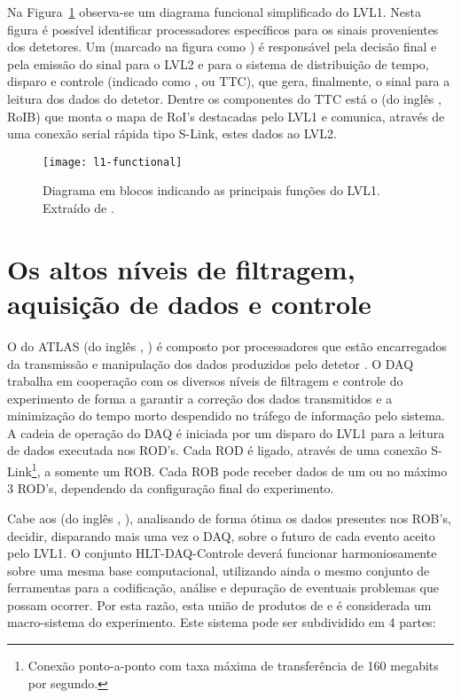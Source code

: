 Na Figura~\ref{fig:l1-functional} observa-se um diagrama funcional
simplificado do LVL1. Nesta figura é possível identificar processadores
específicos para os sinais provenientes dos detetores. Um  (marcado na figura como ) é responsável pela decisão final e pela emissão do sinal para o
LVL2 e para o sistema de distribuição de tempo, disparo e controle (indicado
como , ou TTC), que gera,
finalmente, o sinal para a leitura dos dados do detetor. Dentre os componentes
do TTC está o  (do inglês , RoIB)
que monta o mapa de RoI's destacadas pelo LVL1 e comunica, através de uma
conexão serial rápida tipo S-Link, estes dados ao LVL2.

\begin{figure}
\begin{center}
\texttt{[image: l1-functional]}
\end{center}
\caption[Diagrama em blocos indicando as principais funções do LVL1.]{Diagrama
em blocos indicando as principais funções do LVL1. Extraído de \cite{hlt-tdr}.}
\label{fig:l1-functional}
\end{figure}

\section{Os altos níveis de filtragem, aquisição de dados e controle}
\label{sec:hlt-daq}


O  do ATLAS (do inglês , ) é composto por processadores que estão
encarregados da transmissão e manipulação dos dados produzidos pelo detetor
\cite{hlt-tdr}. O DAQ trabalha em cooperação com os diversos níveis de
filtragem e controle do experimento de forma a garantir a correção dos dados
transmitidos e a minimização do tempo morto despendido no tráfego de
informação pelo sistema. A cadeia de operação do DAQ é iniciada por um disparo
do LVL1 para a leitura de dados executada nos ROD's. Cada ROD é ligado,
através de uma conexão S-Link\footnote{Conexão ponto-a-ponto com taxa máxima
de transferência de 160 megabits por segundo.}, a somente um ROB. Cada ROB
pode receber dados de um ou no máximo 3 ROD's, dependendo da configuração
final do experimento.

Cabe aos  (do inglês , ), analisando de forma ótima os dados presentes nos ROB's,
decidir, disparando mais uma vez o DAQ, sobre o futuro de cada evento aceito
pelo LVL1. O conjunto HLT-DAQ-Controle deverá funcionar harmoniosamente sobre
uma mesma base computacional, utilizando ainda o mesmo conjunto de ferramentas
para a codificação, análise e depuração de eventuais problemas que possam
ocorrer. Por esta razão, esta união de produtos de  e
 é considerada um macro-sistema do experimento. Este sistema
pode ser subdividido em 4 partes:

